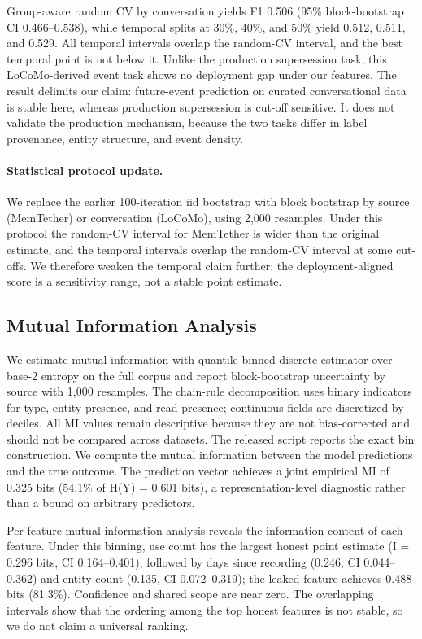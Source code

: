 \documentclass[sigconf,nonacm]{acmart}
\begin{document}
Group-aware random CV by conversation yields F1 0.506 (95\% block-bootstrap CI 0.466--0.538), while temporal splits at 30\%, 40\%, and 50\% yield 0.512, 0.511, and 0.529. All temporal intervals overlap the random-CV interval, and the best temporal point is not below it. Unlike the production supersession task, this LoCoMo-derived event task shows no deployment gap under our features. The result delimits our claim: future-event prediction on curated conversational data is stable here, whereas production supersession is cut-off sensitive. It does not validate the production mechanism, because the two tasks differ in label provenance, entity structure, and event density.

\paragraph{Statistical protocol update.}
We replace the earlier 100-iteration iid bootstrap with block bootstrap by source (MemTether) or conversation (LoCoMo), using 2,000 resamples. Under this protocol the random-CV interval for MemTether is wider than the original estimate, and the temporal intervals overlap the random-CV interval at some cut-offs. We therefore weaken the temporal claim further: the deployment-aligned score is a sensitivity range, not a stable point estimate.

\subsection{Mutual Information Analysis}
\label{sec:mi}

We estimate mutual information with quantile-binned discrete estimator over base-2 entropy on the full corpus and report block-bootstrap uncertainty by source with 1,000 resamples. The chain-rule decomposition uses binary indicators for type, entity presence, and read presence; continuous fields are discretized by deciles. All MI values remain descriptive because they are not bias-corrected and should not be compared across datasets. The released script reports the exact bin construction. We compute the mutual information between the model predictions and the true outcome. The prediction vector achieves a joint empirical MI of 0.325 bits (54.1\% of H(Y) = 0.601 bits), a representation-level diagnostic rather than a bound on arbitrary predictors.

Per-feature mutual information analysis reveals the information content of each feature. Under this binning, use count has the largest honest point estimate (I = 0.296 bits, CI 0.164--0.401), followed by days since recording (0.246, CI 0.044--0.362) and entity count (0.135, CI 0.072--0.319); the leaked feature achieves 0.488 bits (81.3\%). Confidence and shared scope are near zero. The overlapping intervals show that the ordering among the top honest features is not stable, so we do not claim a universal ranking.
\end{document}
